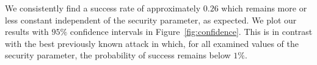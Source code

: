 We consistently find a success rate of approximately $0.26$ which remains more or less constant independent of the security parameter, as expected. We plot our results with $95\%$ confidence intervals in Figure~\ref{fig:confidence}. This is in contrast with the best previously known attack in which, for all examined values of the security parameter, the probability of success remains below $1\%$.
